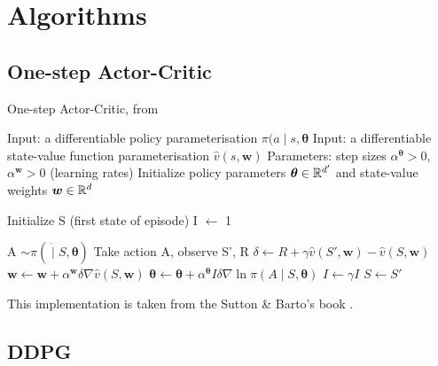 \chapter{Algorithms}
\label{app:algs}

\section{One-step Actor-Critic}
\label{app:algs_ActorCritic}
\begin{algorithm}
\caption{One-step Actor-Critic, from \cite{suttonAndBartoBook}} \label{alg:OneStepActorCritic}
    \begin{algorithmic}[1]
    \State Input: a differentiable policy parameterisation $\pi (a \mid s, \boldsymbol{\theta}$
    \State Input: a differentiable state-value function parameterisation $\hat{v}(s, \boldsymbol{w})$
    \State Parameters: step sizes $\alpha^{\boldsymbol{\theta}} > 0$, $\alpha^{\boldsymbol{w}} > 0$ (learning rates)
    \State Initialize policy parameters $\boldsymbol{\theta} \in \mathbb{R}^{d'}$ and state-value weights $\boldsymbol{w} \in \mathbb{R}^d$
    
        \State Initialize S (first state of episode)
        \State I $\gets$ 1
        
        
            \State A $\sim \pi ( \dot \mid S, \boldsymbol{\theta})$
            \State Take action A, observe S', R
            \State $\delta \leftarrow R + \gamma \hat{v}(S', \boldsymbol{w}) - \hat{v}(S, \boldsymbol{w})$
            \State $\boldsymbol{w} \leftarrow \boldsymbol{w} + \alpha^{\boldsymbol{w}} \delta \nabla \hat{v}(S, \boldsymbol{w})$
            \State $\boldsymbol{\theta} \leftarrow \boldsymbol{\theta} + \alpha^{\boldsymbol{\theta}} I \delta \nabla \ln \pi (A \mid S, \boldsymbol{\theta})$
            \State $I \leftarrow \gamma I$
            \State $S \leftarrow S'$
        \EndWhile
    \EndFor
    \end{algorithmic}
\end{algorithm}
\noindent
This implementation is taken from the Sutton \& Barto's book \cite{suttonAndBartoBook}.

\newpage
\section{DDPG}
\label{app:algs_DDPG}

